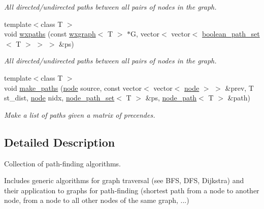 \begin{DoxyCompactItemize}
\begin{DoxyCompactList}\small\item\em All directed/undirected paths between all pairs of nodes in the graph. \end{DoxyCompactList}\item 
{\footnotesize template$<$class T $>$ }\\void \hyperlink{namespacelgraph_1_1traversal_a8c0b0ebe4cbc4c84d4680727df88d307}{wxpaths} (const \hyperlink{classlgraph_1_1utils_1_1wxgraph}{wxgraph}$<$ T $>$ $\ast$G, vector$<$ vector$<$ \hyperlink{namespacelgraph_1_1utils_aaf50131e15d771a45620336d6e7a77f8}{boolean\+\_\+path\+\_\+set}$<$ T $>$ $>$ $>$ \&ps)
\begin{DoxyCompactList}\small\item\em All directed/undirected paths between all pairs of nodes in the graph. \end{DoxyCompactList}\item 
{\footnotesize template$<$class T $>$ }\\void \hyperlink{namespacelgraph_1_1traversal_a4e9d55395fdaa0ee831766decb20760b}{make\+\_\+paths} (\hyperlink{namespacelgraph_1_1utils_ab9c6b34241f0b68372c55f34c460e863}{node} source, const vector$<$ vector$<$ \hyperlink{namespacelgraph_1_1utils_ab9c6b34241f0b68372c55f34c460e863}{node} $>$ $>$ \&prev, T st\+\_\+dist, \hyperlink{namespacelgraph_1_1utils_ab9c6b34241f0b68372c55f34c460e863}{node} nidx, \hyperlink{namespacelgraph_1_1utils_a723c115f9865edfab11a90377b9abef4}{node\+\_\+path\+\_\+set}$<$ T $>$ \&ps, \hyperlink{classlgraph_1_1utils_1_1node__path}{node\+\_\+path}$<$ T $>$ \&path)\hypertarget{namespacelgraph_1_1traversal_a4e9d55395fdaa0ee831766decb20760b}{}\label{namespacelgraph_1_1traversal_a4e9d55395fdaa0ee831766decb20760b}

\begin{DoxyCompactList}\small\item\em Make a list of paths given a matrix of precendes. \end{DoxyCompactList}\end{DoxyCompactItemize}


\subsection{Detailed Description}
Collection of path-\/finding algorithms. 

Includes generic algorithms for graph traversal (see B\+FS, D\+FS, Dijkstra) and their application to graphs for path-\/finding (shortest path from a node to another node, from a node to all other nodes of the same graph, ...) 

